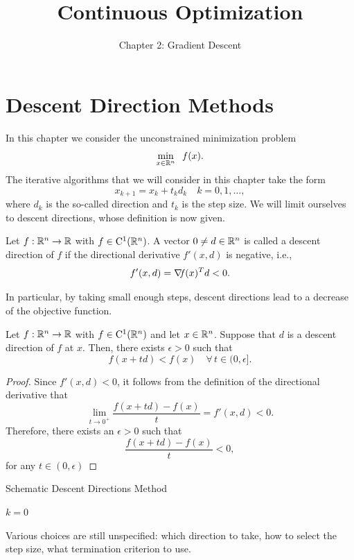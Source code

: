 \documentclass[10pt,a4paper]{article}
\title{Continuous Optimization}
\author{Chapter 2: Gradient Descent}
\date{}
\begin{document}
	\maketitle
	\section{Descent Direction Methods}
	\noindent In this chapter we consider the unconstrained minimization problem
	\begin{equation*}
		\min_{x\in\mathbb{R}^n} \;\; f(x).
	\end{equation*}
The iterative algorithms that we will consider in this chapter take the form
\begin{equation*}
	x_{k+1} = x_k +t_k d_k \quad k=0,1, \dots,
\end{equation*}
where $d_k$ is the so-called direction and $t_k$ is the step size. We will limit ourselves to descent
directions, whose definition is now given.
\begin{definition}
	Let $f:\mathbb{R}^n\to\mathbb{R}$ with $f\in\mathord{\mathrm{C^1}}(\mathbb{R}^n)$. A vector $0\neq d\in \mathbb{R}^n$ is called a descent direction of $f$ if the directional derivative $f'(x,d)$ is negative, i.e., 
	\begin{equation*}
		f'(x,d)= \operatorname*{\mathit{\nabla \!f}}(x)^T d < 0.
	\end{equation*}
\end{definition}
In particular, by taking small enough steps, descent directions lead to a decrease of the objective function.
\begin{lemma}
	Let $f:\mathbb{R}^n\to\mathbb{R}$ with $f\in\mathord{\mathrm{C^1}}(\mathbb{R}^n)$ and let $x\in \mathbb{R}^n$. Suppose that $d$ is a descent direction of $f$ at $x$. Then, there exists $\epsilon>0$ such that 
	\begin{equation*}
		f(x+td) < f(x) \quad \forall \, t \in (0,\epsilon].
	\end{equation*} 
\end{lemma}
\begin{proof}
	Since $f'(x,d)<0$, it follows from the definition of the directional derivative that 
	\begin{equation*}
		\lim_{t\to 0^+}\frac{f(x+td)-f(x)}{t} = f'(x,d) <0.
	\end{equation*}
Therefore, there exists an $\epsilon>0$ such that 
\begin{equation*}
	\frac{f(x+td)-f(x)}{t}<0,
\end{equation*}
for any $t\in(0,\epsilon)$
\end{proof}
\begin{algorithm}[H]\label{alg}
	\caption{Schematic Descent Directions Method}
	
	
	$k = 0$
	
\end{algorithm}
\noindent Various choices are still unspecified: which direction to take, how to select the step size, what termination criterion to use.
\end{document}
